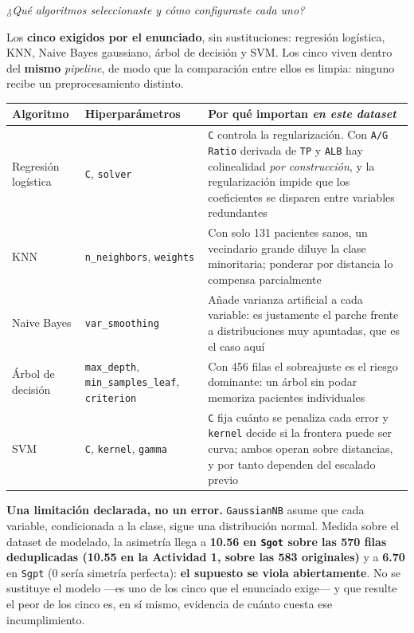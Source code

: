 \documentclass[10pt,a4paper]{article}
\begin{document}
\textit{¿Qué algoritmos seleccionaste y cómo configuraste cada uno?}

Los \textbf{cinco exigidos por el enunciado}, sin sustituciones: regresión logística, KNN, Naive Bayes gaussiano, árbol de decisión y SVM. Los cinco viven dentro del \textbf{mismo} \textit{pipeline}, de modo que la comparación entre ellos es limpia: ninguno recibe un preprocesamiento distinto.

\begin{table}[H]
\footnotesize
\begin{tabularx}{\textwidth}{@{}l l X@{}}
\toprule
\textbf{Algoritmo} & \textbf{Hiperparámetros} & \textbf{Por qué importan \textit{en este dataset}} \\
\midrule
Regresión logística & \texttt{C}, \texttt{solver} & \texttt{C} controla la regularización. Con \texttt{A/G Ratio} derivada de \texttt{TP} y \texttt{ALB} hay colinealidad \textit{por construcción}, y la regularización impide que los coeficientes se disparen entre variables redundantes \\
KNN & \texttt{n\_neighbors}, \texttt{weights} & Con solo 131 pacientes sanos, un vecindario grande diluye la clase minoritaria; ponderar por distancia lo compensa parcialmente \\
Naive Bayes & \texttt{var\_smoothing} & Añade varianza artificial a cada variable: es justamente el parche frente a distribuciones muy apuntadas, que es el caso aquí \\
Árbol de decisión & \texttt{max\_depth}, \texttt{min\_samples\_leaf}, \texttt{criterion} & Con 456 filas el sobreajuste es el riesgo dominante: un árbol sin podar memoriza pacientes individuales \\
SVM & \texttt{C}, \texttt{kernel}, \texttt{gamma} & \texttt{C} fija cuánto se penaliza cada error y \texttt{kernel} decide si la frontera puede ser curva; ambos operan sobre distancias, y por tanto dependen del escalado previo \\
\bottomrule
\end{tabularx}
\end{table}

\textbf{Una limitación declarada, no un error.} \texttt{GaussianNB} asume que cada variable, condicionada a la clase, sigue una distribución normal. Medida sobre el dataset de modelado, la asimetría llega a \textbf{10.56 en \texttt{Sgot} sobre las 570 filas deduplicadas (10.55 en la Actividad 1, sobre las 583 originales)} y a \textbf{6.70} en \texttt{Sgpt} (0 sería simetría perfecta): \textbf{el supuesto se viola abiertamente}. No se sustituye el modelo ---es uno de los cinco que el enunciado exige--- y que resulte el peor de los cinco es, en sí mismo, evidencia de cuánto cuesta ese incumplimiento.
\end{document}
